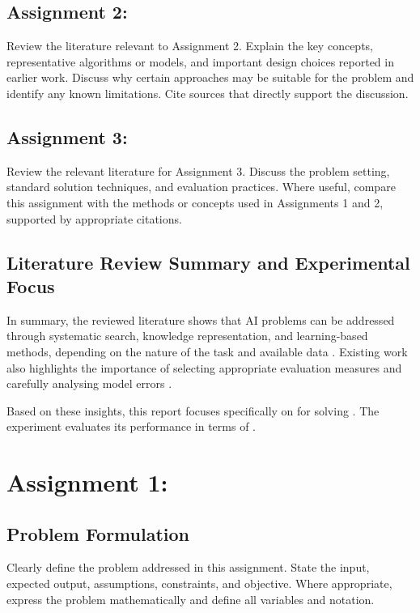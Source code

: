 \documentclass{ai-lab-report}
\begin{document}
\subsection{Assignment 2: }
Review the literature relevant to Assignment 2. Explain the key concepts, representative algorithms or models, and important design choices reported in earlier work. Discuss why certain approaches may be suitable for the problem and identify any known limitations. Cite sources that directly support the discussion.

\subsection{Assignment 3: }
Review the relevant literature for Assignment 3. Discuss the problem setting, standard solution techniques, and evaluation practices. Where useful, compare this assignment with the methods or concepts used in Assignments 1 and 2, supported by appropriate citations.

\subsection{Literature Review Summary and Experimental Focus}
In summary, the reviewed literature shows that AI problems can be addressed through systematic search, knowledge representation, and learning-based methods, depending on the nature of the task and available data \citep{russell2021ai,bishop2006prml}. Existing work also highlights the importance of selecting appropriate evaluation measures and carefully analysing model errors \citep{sklearnUserGuide}.

Based on these insights, this report focuses specifically on  for solving . The experiment evaluates its performance in terms of .

\section{Assignment 1: }

\subsection{Problem Formulation}
Clearly define the problem addressed in this assignment. State the input, expected output, assumptions, constraints, and objective. Where appropriate, express the problem mathematically and define all variables and notation.
\end{document}
